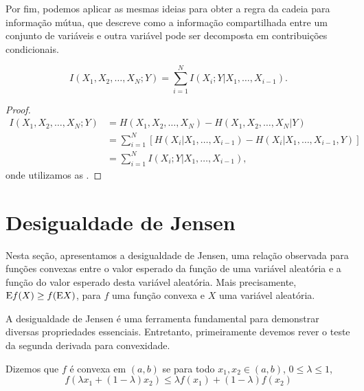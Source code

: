 Por fim, podemos aplicar as mesmas ideias para obter a regra da cadeia para
informação mútua, que descreve como a informação compartilhada entre um
conjunto de variáveis e outra variável pode ser decomposta em contribuições
condicionais. 
\begin{proposition}\label{pro:regracadeiainfmut}
\begin{equation}\label{eq:regracadeiainfmut}
I(X_1, X_2, \ldots, X_N ; Y) = \sum_{i=1}^{N} I(X_i;Y|X_1, \ldots, X_{i-1}) .
\end{equation}
\end{proposition}
\begin{proof}
\begin{subequations}\label{eq:dmregracadeiainfmut}
\begin{align}
    I(X_1, X_2, \ldots, X_N ; Y) &= H(X_1, X_2, \ldots, X_N) - H(X_1, X_2, \ldots, X_N | Y) \\
				 &= \sum_{i=1}^{N} \left[ H(X_i | X_1, \ldots, X_{i-1}) - H(X_i | X_1, \ldots, X_{i-1}, Y) \right] \\
				 &= \sum_{i=1}^{N} I(X_i;Y|X_1, \ldots, X_{i-1}) ,
\end{align}
\end{subequations}
onde utilizamos as .
\end{proof}





\section{Desigualdade de Jensen}\label{sec:desjensen}
Nesta seção, apresentamos a desigualdade de Jensen, uma relação observada para
funções convexas entre o valor esperado da função de uma variável
aleatória e a função do valor esperado desta variável aleatória. Mais precisamente,
$\mathrm{E} f(X) \geq f(\mathrm{E} X)$, para $f$ uma função convexa e $X$ uma variável aleatória.

A desigualdade de Jensen é uma ferramenta fundamental para demonstrar diversas propriedades essenciais.
Entretanto, primeiramente devemos rever o teste da segunda derivada para convexidade.

\begin{definition}
Dizemos que $f$ é convexa em $(a,b)$ se para todo $x_1,x_2 \in (a,b)$, $0 \leq \lambda \leq 1$,
\begin{equation}
f(\lambda x_1 + (1 - \lambda)x_2) \leq \lambda f(x_1) + (1-\lambda) f(x_2)
\end{equation}
\end{definition}


